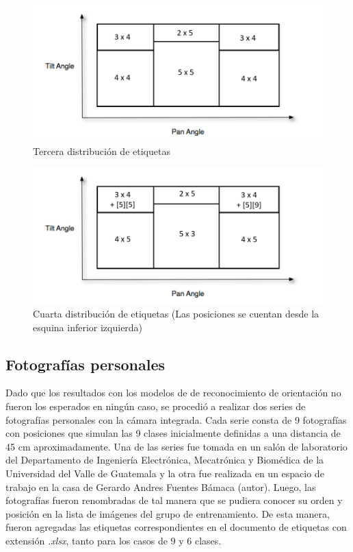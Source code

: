 \begin{figure}[H]
	\centering
	\includegraphics[scale=1]{figures/clasi2.png}
	\caption{Tercera distribución de etiquetas}
	\label{fig:img7}
\end{figure}

\begin{figure}[H]
	\centering
	\includegraphics[scale=1]{figures/clasi3.png}
	\caption{Cuarta distribución de etiquetas (Las posiciones se cuentan desde la esquina inferior izquierda)}
	\label{fig:img8}
\end{figure}


\subsection{Fotografías personales}
Dado que los resultados con los modelos de de reconocimiento de orientación no fueron los esperados en ningún caso, se procedió a realizar dos series de fotografías personales con la cámara integrada. Cada serie consta de 9 fotografías con posiciones que simulan las 9 clases inicialmente definidas a una distancia de 45 cm aproximadamente. Una de las series fue tomada en un salón de laboratorio del Departamento de Ingeniería Electrónica, Mecatrónica y Biomédica de la Universidad del Valle de Guatemala y la otra fue realizada en un espacio de trabajo en la casa de Gerardo Andres Fuentes Bámaca (autor). Luego, las fotografías fueron renombradas de tal manera que se pudiera conocer su orden y posición en la lista de imágenes del grupo de entrenamiento. De esta manera, fueron agregadas las etiquetas correspondientes en el documento de etiquetas con extensión \textit{.xlsx}, tanto para los casos de 9 y 6 clases.
